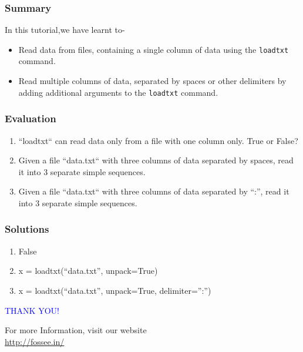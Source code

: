 \documentclass[presentation]{beamer}
\begin{document}
\begin{frame}
\frametitle{Summary}
\label{sec-4}

  In this tutorial,we have learnt to-

\begin{itemize}
\item Read data from files, containing a single column of data using the
    \verb~loadtxt~ command.
\item Read multiple columns of data, separated by spaces or other
    delimiters by adding additional arguments to the \verb~loadtxt~ command.
\end{itemize}
\end{frame}
\begin{frame}
\frametitle{Evaluation}
\label{sec-5}


\begin{enumerate}
\item ``loadtxt`` can read data only from a file with one column only.
     True or False?
\item Given a file ``data.txt`` with three columns of data separated by
     spaces, read it into 3 separate simple sequences.
\item Given a file ``data.txt`` with three columns of data separated by
     ``:'', read it into 3 separate simple sequences.
\end{enumerate}
  
\end{frame}
\begin{frame}
\frametitle{Solutions}
\label{sec-6}


\begin{enumerate}
\item False
\item x = loadtxt(``data.txt'', unpack=True)
\item x = loadtxt(``data.txt'', unpack=True, delimiter='':'')
\end{enumerate}
\end{frame}
\begin{frame}

   \begin{block}{}
  \begin{center}
  \textcolor{blue}{\Large THANK YOU!} 
  \end{center}
  \end{block}
\begin{block}{}
  \begin{center}
    For more Information, visit our website\\
    \url{http://fossee.in/}
  \end{center}  
  \end{block}
\end{frame}
\end{document}
